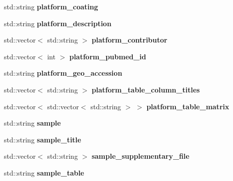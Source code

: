 \begin{DoxyCompactItemize}
\item 
\mbox{\label{structGeoSoft_ac6a2b4cea24979fbaae7b4035570d9fe}} 
std\+::string {\bfseries platform\+\_\+coating}
\item 
\mbox{\label{structGeoSoft_a1c46744829230258c32d30dc4efaa78e}} 
std\+::string {\bfseries platform\+\_\+description}
\item 
\mbox{\label{structGeoSoft_ae8b4d688d95191425854c2f45e656f35}} 
std\+::vector$<$ std\+::string $>$ {\bfseries platform\+\_\+contributor}
\item 
\mbox{\label{structGeoSoft_ac1b47c9e117ea78e8a02eb027c2b0945}} 
std\+::vector$<$ int $>$ {\bfseries platform\+\_\+pubmed\+\_\+id}
\item 
\mbox{\label{structGeoSoft_a1652bb9b56ddd9891d2e6d806e94685f}} 
std\+::string {\bfseries platform\+\_\+geo\+\_\+accession}
\item 
\mbox{\label{structGeoSoft_a21634a342e59fbc3f58e66a576c352c9}} 
std\+::vector$<$ std\+::string $>$ {\bfseries platform\+\_\+table\+\_\+column\+\_\+titles}
\item 
\mbox{\label{structGeoSoft_aff0f9540dd4c63379a518bb409feb189}} 
std\+::vector$<$ std\+::vector$<$ std\+::string $>$ $>$ {\bfseries platform\+\_\+table\+\_\+matrix}
\item 
\mbox{\label{structGeoSoft_aec7ad1febe0db88501e7f11668daed16}} 
std\+::string {\bfseries sample}
\item 
\mbox{\label{structGeoSoft_a3d684b518530bd8b72b343a2ed08241e}} 
std\+::string {\bfseries sample\+\_\+title}
\item 
\mbox{\label{structGeoSoft_aa8f183fa6ad9742d08ec14f6223798b6}} 
std\+::vector$<$ std\+::string $>$ {\bfseries sample\+\_\+supplementary\+\_\+file}
\item 
\mbox{\label{structGeoSoft_a5afad62e351fe888bd4ab89dd098b574}} 
std\+::string {\bfseries sample\+\_\+table}
\item 

\end{DoxyCompactItemize}
